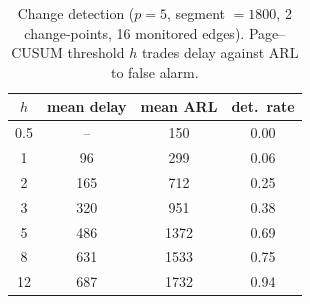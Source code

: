 \begin{table}[htbp]
\centering
\caption{Change detection ($p=5$, segment $=1800$, 2 change-points, 16 monitored edges). Page--CUSUM threshold $h$ trades delay against ARL to false alarm.}
\label{tab:change}
\begin{tabular}{cccc}
\hline
$h$ & mean delay & mean ARL & det.\ rate \\
\hline
0.5 & -- & 150 & 0.00 \\
1 & 96 & 299 & 0.06 \\
2 & 165 & 712 & 0.25 \\
3 & 320 & 951 & 0.38 \\
5 & 486 & 1372 & 0.69 \\
8 & 631 & 1533 & 0.75 \\
12 & 687 & 1732 & 0.94 \\
\hline
\end{tabular}
\end{table}
